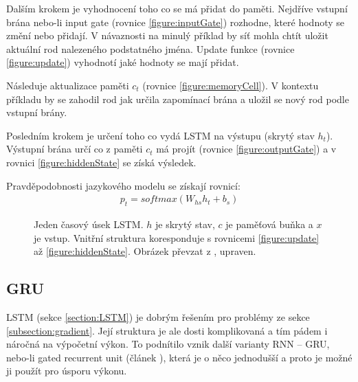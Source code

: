 Dalším krokem je vyhodnocení toho co se má přidat do paměti. Nejdříve vstupní brána nebo-li input gate (rovnice \ref{figure:inputGate}) rozhodne, které hodnoty se změní nebo přidají. V návaznosti na minulý příklad by síť mohla chtít uložit aktuální rod nalezeného podstatného jména. Update funkce (rovnice \ref{figure:update}) vyhodnotí jaké hodnoty se mají přidat.

Následuje aktualizace paměti $c_t$ (rovnice \ref{figure:memoryCell}). V kontextu příkladu by se zahodil rod jak určila zapomínací brána a uložil se nový rod podle vstupní brány.

Posledním krokem je určení toho co vydá LSTM na výstupu (skrytý stav $h_t$). Výstupní brána určí co z paměti $c_t$ má projít (rovnice \ref{figure:outputGate}) a v rovnici \ref{figure:hiddenState} se získá výsledek.

Pravděpodobnosti jazykového modelu se získají rovnicí:
\begin{align}
    p_t = softmax(W_{hs}h_{t} + b_{s})
\end{align}


\begin{figure}[H]
    \begin{center}
    \end{center}
	\caption{Jeden časový úsek LSTM. $h$ je skrytý stav, $c$ je paměťová buňka a $x$ je vstup. Vnitřní struktura koresponduje s rovnicemi \ref{figure:update} až \ref{figure:hiddenState}. Obrázek převzat z \cite{understandingLSTM}, upraven.}
	\label{img:LSTM}
\end{figure}



\subsection{GRU}\label{section:GRU}
LSTM (sekce \ref{section:LSTM}) je dobrým řešením pro problémy ze sekce \ref{subsection:gradient}. Její struktura je ale dosti komplikovaná a tím pádem i náročná na výpočetní výkon. To podnítilo vznik další varianty RNN -- GRU, nebo-li gated recurrent unit (článek \cite{GRU}), která je o něco jednodušší a proto je možné ji použít pro úsporu výkonu.

